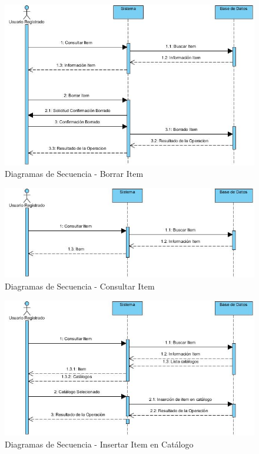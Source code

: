 \documentclass[a4paper,11pt]{book}
\begin{document}
\begin{figure}[H] 
\centering 
\includegraphics[scale=0.50]{imagenes/secuencia/Borrar_Item.jpg}
\caption{ Diagramas de Secuencia - Borrar Item\cite{diagrama}  }  
\end{figure}

\begin{figure}[H] 
\centering 
\includegraphics[scale=0.50]{imagenes/secuencia/Consultar_Item.jpg}
\caption{ Diagramas de Secuencia - Consultar Item\cite{diagrama}  }  
\end{figure}

\begin{figure}[H] 
\centering 
\includegraphics[scale=0.50]{imagenes/secuencia/Insertar_Item_Catalogo.jpg}
\caption{ Diagramas de Secuencia - Insertar Item en Catálogo\cite{diagrama}  }  
\end{figure}
\end{document}
